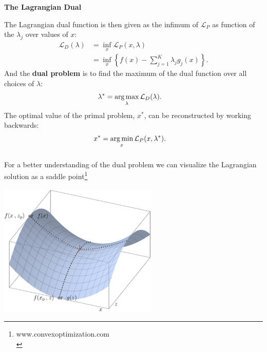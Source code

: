 \documentclass[xetex,mathserif,serif,aspectratio=169]{beamer}
\begin{document}
\begin{frame}[fragile] \frametitle{} \oldB \small

\textbf{The Lagrangian Dual}

The Lagrangian dual function is then given as the infimum
of $\mathcal{L}_P$ as function of the $\lambda_j$ over
values of $x$:
\begin{align*}
\mathcal{L}_D(\lambda) &= \inf_{x} \mathcal{L}_P(x,\lambda) \\
&=\inf_{x} \left\{ f(x) - \sum_{j=1}^K \lambda_j g_j(x)  \right\}.
\end{align*}
And the \textbf{dual problem} is to find the maximum of the
dual function over all choices of $\lambda$:
\begin{align*}
\lambda^{*} &= \mathop{\mathrm{arg\,max}}_{\lambda} \mathcal{L}_D(\lambda).
\end{align*}
The optimal value of the primal problem, $x^{*}$, can be reconstructed
by working backwards:
\begin{align*}
x^{*} &= \mathop{\mathrm{arg\,min}}_{x} \mathcal{L}_P(x, \lambda^{*}).
\end{align*}

\end{frame}

\begin{frame}[fragile] \frametitle{} \oldB \small

For a better understanding of the dual problem we can visualize the
Lagrangian solution as a saddle point\footnote{www.convexoptimization.com \\}

\vspace{-0in}

\begin{center}
\includegraphics[height=2.5in]{img/saddle}
\end{center}

\end{frame}
\end{document}
